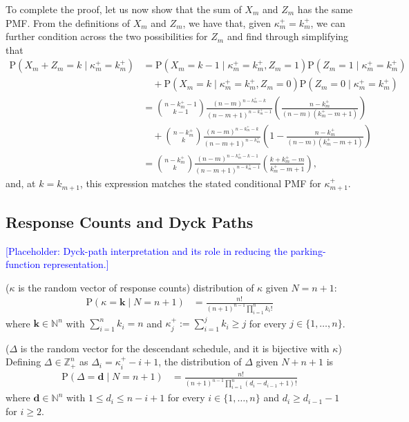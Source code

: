 \documentclass[stsy,dblanonrev]{amers/INFORMS-STSY-Template-26-02-2026/informs4}
\newcommand{\PP}[1]{\mathrm{P}\left(#1\right)}
\newcommand{\placeholder}[1]{\par\noindent\textcolor{blue}{[Placeholder: #1]}\par}
\begin{document}
To complete the proof, let us now show that the sum of $X_m$ and $Z_m$ has the same PMF. From the definitions of $X_m$ and $Z_m$, we have that, given $\kappa_m^+ = k_m^+$, we can further condition across the two possibilities for $Z_m$ and find through simplifying that
\begin{align}
\PP{X_m + Z_m = k \mid \kappa_m^+ = k_m^+}
&=
\PP{X_m = k - 1 \mid \kappa_m^+ = k_m^+, Z_m = 1}\PP{Z_m = 1 \mid \kappa_m^+ = k_m^+}
\nonumber
\\
&
\quad
+
\PP{X_m = k \mid \kappa_m^+ = k_m^+, Z_m = 0}\PP{Z_m = 0 \mid \kappa_m^+ = k_m^+}
\\
&=
{n - k_m^+ - 1 \choose k-1}\frac{(n-m)^{n-k_m^+-k}}{(n-m+1)^{n-k_m^+-1}}
\left(\frac{n-k_m^+}{(n-m)(k_m^+ - m + 1)} \right)
\nonumber
\\
&
\quad
+
{n - k_m^+ \choose k}\frac{(n-m)^{n-k_m^+-k}}{(n-m+1)^{n-k_m^+}}
\left(1- \frac{n-k_m^+}{(n-m)(k_m^+ - m + 1)} \right)
\\
&=
{n - k_m^+ \choose k}\frac{(n-m)^{n-k_m^+-k-1}}{(n-m+1)^{n-k_m^+-1}}
\left(
\frac{k
+
k_m^+
- 
m }{k_m^+-m+1}
\right)
,
\end{align}
and, at $k = k_{m+1}$, this expression matches the stated conditional PMF for $\kappa_{m+1}^+$.
\hfill\Halmos\endproof

\subsection{Response Counts and Dyck Paths}
\placeholder{Dyck-path interpretation and its role in reducing the parking-function representation.}
($\kappa$ is the random vector of response counts) distribution of $\kappa$ given $N=n+1$:
\begin{align}\label{eq:kappaPMF}
\PP{\kappa = \mathbf{k} \mid N = n+1}
&=
\frac{n!}{(n+1)^{n-1}\prod_{i=1}^n k_i !}
\end{align}
where $\mathbf{k} \in \mathbb{N}^n$ with $\sum_{i=1}^n k_i = n$ and $\kappa_j^+ := \sum_{i=1}^j k_i \geq j$ for every $j \in \{1, \dots, n\}$.

($\Delta$ is the random vector for the descendant schedule, and it is bijective with $\kappa$) Defining $\Delta \in \mathbb{Z}_+^n$ as $\Delta_i = \kappa_i^+ - i + 1$, the distribution of $\Delta$ given $N+n+1$ is
\begin{align}\label{eq:schedulePMF}
\PP{\Delta = \mathbf{d} \mid N = n+1}
&=
\frac{n!}{(n+1)^{n-1}\prod_{i=1}^n \left(d_{i} - d_{i-1} + 1\right) !}
\end{align}
where $\mathbf{d} \in \mathbb{N}^n$ with $1 \leq d_i \leq n - i + 1$ for every $i \in \{1, \dots, n\}$ and $d_i \geq d_{i-1} - 1$ for $i \geq 2$.
\end{document}
